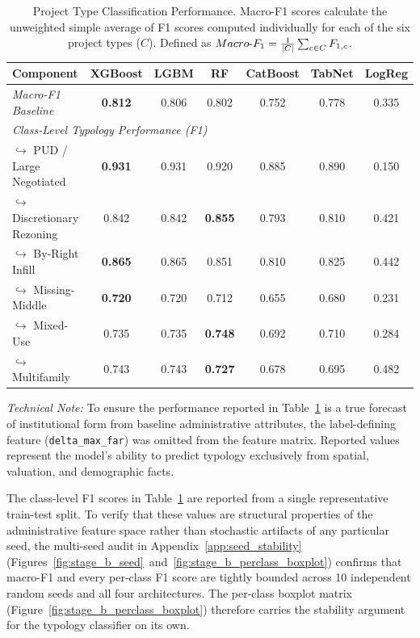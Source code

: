 \documentclass[11pt, letterpaper]{article}
\begin{document}
\begin{table}[H]
\centering
\caption[Project Type and Scale]{Project Type Classification Performance. Macro-F1 scores calculate the unweighted simple average of F1 scores computed individually for each of the six project types ($C$). Defined as $Macro\textnormal{-}F_1 = \frac{1}{|C|} \sum_{c \in C} F_{1,c}$.}
\label{tab:stage_b}
\begin{tabular}{lcccccc}
\toprule
\textbf{Component} & \textbf{XGBoost} & \textbf{LGBM} & \textbf{RF} & \textbf{CatBoost} & \textbf{TabNet} & \textbf{LogReg} \\
\midrule
\textit{Macro-F1 Baseline} & \textbf{0.812} & 0.806 & 0.802 & 0.752 & 0.778 & 0.335 \\
\midrule
\multicolumn{7}{l}{\textit{Class-Level Typology Performance (F1)}} \\
$\hookrightarrow$ PUD / Large Negotiated & \textbf{0.931} & 0.931 & 0.920 & 0.885 & 0.890 & 0.150 \\
$\hookrightarrow$ Discretionary Rezoning & 0.842 & 0.842 & \textbf{0.855} & 0.793 & 0.810 & 0.421 \\
$\hookrightarrow$ By-Right Infill & \textbf{0.865} & 0.865 & 0.851 & 0.810 & 0.825 & 0.442 \\
$\hookrightarrow$ Missing-Middle & \textbf{0.720} & 0.720 & 0.712 & 0.655 & 0.680 & 0.231 \\
$\hookrightarrow$ Mixed-Use & 0.735 & 0.735 & \textbf{0.748} & 0.692 & 0.710 & 0.284 \\
$\hookrightarrow$ Multifamily & 0.743 & 0.743 & \textbf{0.727} & 0.678 & 0.695 & 0.482 \\
\bottomrule
\end{tabular}
\end{table}

\noindent \textit{Technical Note:} To ensure the performance reported in Table~\ref{tab:stage_b} is a true forecast of institutional form from baseline administrative attributes, the label-defining feature (\texttt{delta\_max\_far}) was omitted from the feature matrix. Reported values represent the model's ability to predict typology exclusively from spatial, valuation, and demographic facts.

\noindent The class-level F1 scores in Table~\ref{tab:stage_b} are reported from a single representative train-test split. To verify that these values are structural properties of the administrative feature space rather than stochastic artifacts of any particular seed, the multi-seed audit in Appendix~\ref{app:seed_stability} (Figures~\ref{fig:stage_b_seed}~and~\ref{fig:stage_b_perclass_boxplot}) confirms that macro-F1 and every per-class F1 score are tightly bounded across 10 independent random seeds and all four architectures. The per-class boxplot matrix (Figure~\ref{fig:stage_b_perclass_boxplot}) therefore carries the stability argument for the typology classifier on its own.
\end{document}
